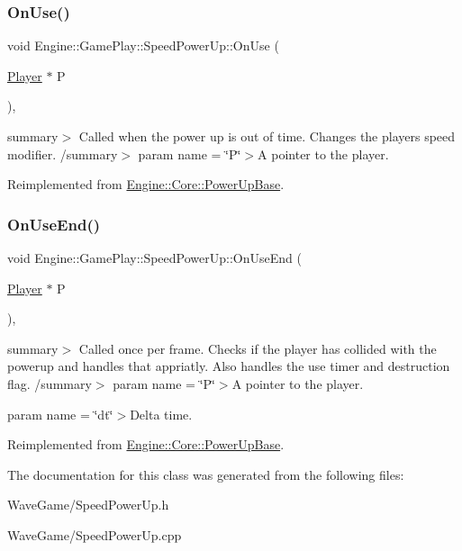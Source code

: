 \subsubsection{\texorpdfstring{On\+Use()}{OnUse()}}
{\footnotesize\ttfamily void Engine\+::\+Game\+Play\+::\+Speed\+Power\+Up\+::\+On\+Use (\begin{DoxyParamCaption}\item[{\hyperlink{class_engine_1_1_game_play_1_1_player}{Player} $\ast$}]{P }\end{DoxyParamCaption})\hspace{0.3cm}{\ttfamily [override]}, {\ttfamily [virtual]}}

summary$>$ Called when the power up is out of time. Changes the players speed modifier. /summary$>$ param name = \char`\"{}\+P\char`\"{}$>$A pointer to the player.

Reimplemented from \hyperlink{class_engine_1_1_core_1_1_power_up_base_a1c93516694b752a8ebc42eb181cb2b78}{Engine\+::\+Core\+::\+Power\+Up\+Base}.

\mbox{\label{class_engine_1_1_game_play_1_1_speed_power_up_ad305e70493c2b51a87e58d58cea73521}} 
\subsubsection{\texorpdfstring{On\+Use\+End()}{OnUseEnd()}}
{\footnotesize\ttfamily void Engine\+::\+Game\+Play\+::\+Speed\+Power\+Up\+::\+On\+Use\+End (\begin{DoxyParamCaption}\item[{\hyperlink{class_engine_1_1_game_play_1_1_player}{Player} $\ast$}]{P }\end{DoxyParamCaption})\hspace{0.3cm}{\ttfamily [override]}, {\ttfamily [virtual]}}

summary$>$ Called once per frame. Checks if the player has collided with the powerup and handles that appriatly. Also handles the use timer and destruction flag. /summary$>$ param name = \char`\"{}\+P\char`\"{}$>$A pointer to the player.

param name = \char`\"{}dt\char`\"{}$>$Delta time.

Reimplemented from \hyperlink{class_engine_1_1_core_1_1_power_up_base_a195aecea60afdb99add60661a1c95697}{Engine\+::\+Core\+::\+Power\+Up\+Base}.



The documentation for this class was generated from the following files\+:\begin{DoxyCompactItemize}
\item 
Wave\+Game/Speed\+Power\+Up.\+h\item 
Wave\+Game/Speed\+Power\+Up.\+cpp\end{DoxyCompactItemize}
